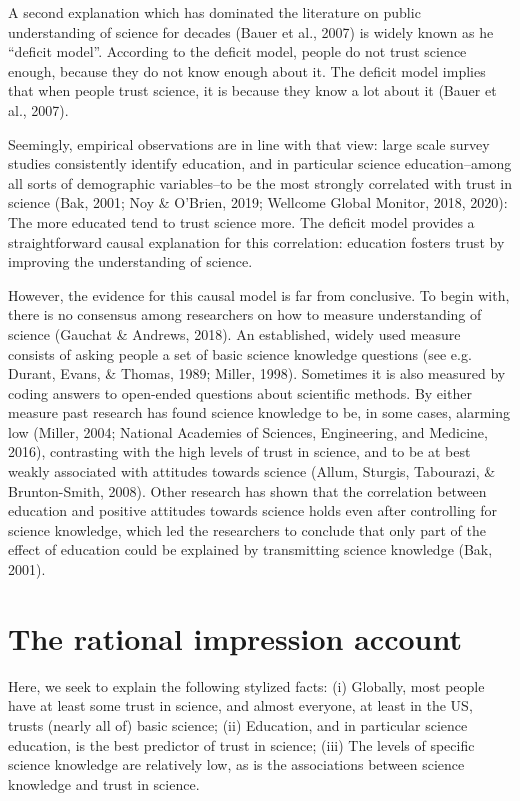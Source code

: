 \documentclass[
  doc,floatsintext]{apa6}
\begin{document}
A second explanation which has dominated the literature on public understanding of science for decades (Bauer et al., 2007) is widely known as he ``deficit model''. According to the deficit model, people do not trust science enough, because they do not know enough about it. The deficit model implies that when people trust science, it is because they know a lot about it (Bauer et al., 2007).

Seemingly, empirical observations are in line with that view: large scale survey studies consistently identify education, and in particular science education--among all sorts of demographic variables--to be the most strongly correlated with trust in science (Bak, 2001; Noy \& O'Brien, 2019; Wellcome Global Monitor, 2018, 2020): The more educated tend to trust science more. The deficit model provides a straightforward causal explanation for this correlation: education fosters trust by improving the understanding of science.

However, the evidence for this causal model is far from conclusive. To begin with, there is no consensus among researchers on how to measure understanding of science (Gauchat \& Andrews, 2018). An established, widely used measure consists of asking people a set of basic science knowledge questions (see e.g. Durant, Evans, \& Thomas, 1989; Miller, 1998). Sometimes it is also measured by coding answers to open-ended questions about scientific methods. By either measure past research has found science knowledge to be, in some cases, alarming low (Miller, 2004; National Academies of Sciences, Engineering, and Medicine, 2016), contrasting with the high levels of trust in science, and to be at best weakly associated with attitudes towards science (Allum, Sturgis, Tabourazi, \& Brunton-Smith, 2008). Other research has shown that the correlation between education and positive attitudes towards science holds even after controlling for science knowledge, which led the researchers to conclude that only part of the effect of education could be explained by transmitting science knowledge (Bak, 2001).

\section{The rational impression account}\label{the-rational-impression-account}

Here, we seek to explain the following stylized facts: (i) Globally, most people have at least some trust in science, and almost everyone, at least in the US, trusts (nearly all of) basic science; (ii) Education, and in particular science education, is the best predictor of trust in science; (iii) The levels of specific science knowledge are relatively low, as is the associations between science knowledge and trust in science.
\end{document}

